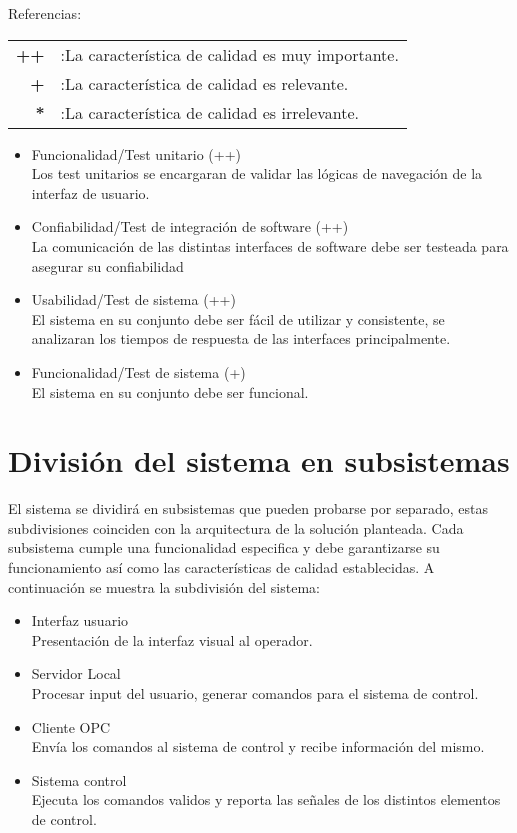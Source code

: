 \documentclass[]{scrreprt}
\begin{document}
Referencias:
\begin{table}[h]
\begin{tabular}{rl}
\textbf{++} & :La característica de calidad es muy importante. \\
\textbf{+}  & :La característica de calidad es relevante.      \\
\textbf{*}  & :La característica de calidad es irrelevante.     
\end{tabular}
\end{table}

\begin{itemize}
	\item Funcionalidad/Test unitario (++)
	\\ Los test unitarios se encargaran de validar las lógicas de navegación de la interfaz de usuario.
	\item Confiabilidad/Test de integración de software (++)
	\\ La comunicación de las distintas interfaces de software debe ser testeada para asegurar su confiabilidad
	\item Usabilidad/Test de sistema (++)
	\\ El sistema en su conjunto debe ser fácil de utilizar y consistente, se analizaran los tiempos de respuesta 		de las interfaces principalmente.
	\item Funcionalidad/Test de sistema (+)
	\\ El sistema en su conjunto debe ser funcional. 						
\end{itemize}


\chapter{División del sistema en subsistemas}
El sistema se dividirá en subsistemas que pueden probarse por separado, estas subdivisiones coinciden con la arquitectura de la solución planteada. Cada subsistema cumple una funcionalidad especifica y debe garantizarse su funcionamiento así como las características de calidad establecidas. A continuación se muestra la subdivisión del sistema:
\begin{itemize}
	\item Interfaz usuario
	\\Presentación de la interfaz visual al operador.
	\item Servidor Local
	\\Procesar input del usuario, generar comandos para el sistema de control.
	\item Cliente OPC
	\\Envía los comandos al sistema de control y recibe información del mismo.
	\item Sistema control
	\\Ejecuta los comandos validos y reporta las señales de los distintos elementos de control.
\end{itemize}
\end{document}
